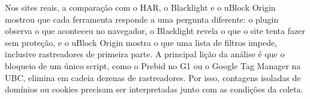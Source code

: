 \documentclass[11pt,a4paper]{article}
\begin{document}
Nos sites reais, a comparação com o HAR, o Blacklight e o uBlock Origin mostrou que cada ferramenta responde a uma pergunta diferente: o plugin observa o que aconteceu no navegador, o Blacklight revela o que o site tenta fazer sem proteção, e o uBlock Origin mostra o que uma lista de filtros impede, inclusive rastreadores de primeira parte. A principal lição da análise é que o bloqueio de um único script, como o Prebid no G1 ou o Google Tag Manager na UBC, elimina em cadeia dezenas de rastreadores. Por isso, contagens isoladas de domínios ou cookies precisam ser interpretadas junto com as condições da coleta.
\end{document}
